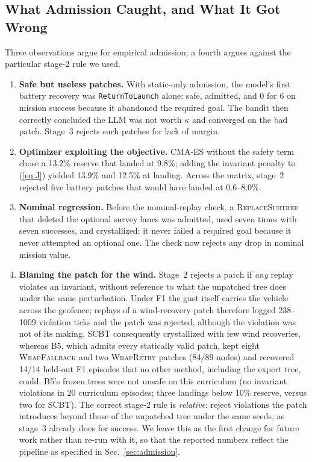 \documentclass[conference]{IEEEtran}
\begin{document}
\subsection{What Admission Caught, and What It Got Wrong}
\label{sec:caught}
Three observations argue for empirical admission; a fourth argues against the particular stage-2 rule we used.
\begin{enumerate}
\item \textbf{Safe but useless patches.} With static-only admission, the model's first battery recovery was \texttt{ReturnToLaunch} alone: safe, admitted, and 0 for 6 on mission success because it abandoned the required goal. The bandit then correctly concluded the LLM was not worth $\kappa$ and converged on the bad patch. Stage~3 rejects such patches for lack of margin.
\item \textbf{Optimizer exploiting the objective.} CMA-ES without the safety term chose a 13.2\% reserve that landed at 9.8\%; adding the invariant penalty to (\ref{eq:J}) yielded 13.9\% and 12.5\% at landing. Across the matrix, stage~2 rejected five battery patches that would have landed at 0.6--8.0\%.
\item \textbf{Nominal regression.} Before the nominal-replay check, a \textsc{ReplaceSubtree} that deleted the optional survey lanes was admitted, used seven times with seven successes, and crystallized: it never failed a required goal because it never attempted an optional one. The check now rejects any drop in nominal mission value.
\item \textbf{Blaming the patch for the wind.} Stage~2 rejects a patch if \emph{any} replay violates an invariant, without reference to what the unpatched tree does under the same perturbation. Under F1 the gust itself carries the vehicle across the geofence; replays of a wind-recovery patch therefore logged 238--1009 violation ticks and the patch was rejected, although the violation was not of its making. SCBT consequently crystallized with few wind recoveries, whereas B5, which admits every statically valid patch, kept eight \textsc{WrapFallback} and two \textsc{WrapRetry} patches (84/89 nodes) and recovered 14/14 held-out F1 episodes that no other method, including the expert tree, could. B5's frozen trees were not unsafe on this curriculum (no invariant violations in 20 curriculum episodes; three landings below 10\% reserve, versus two for SCBT). The correct stage-2 rule is \emph{relative}: reject violations the patch introduces beyond those of the unpatched tree under the same seeds, as stage~3 already does for success. We leave this as the first change for future work rather than re-run with it, so that the reported numbers reflect the pipeline as specified in Sec.~\ref{sec:admission}.
\end{enumerate}
\end{document}

